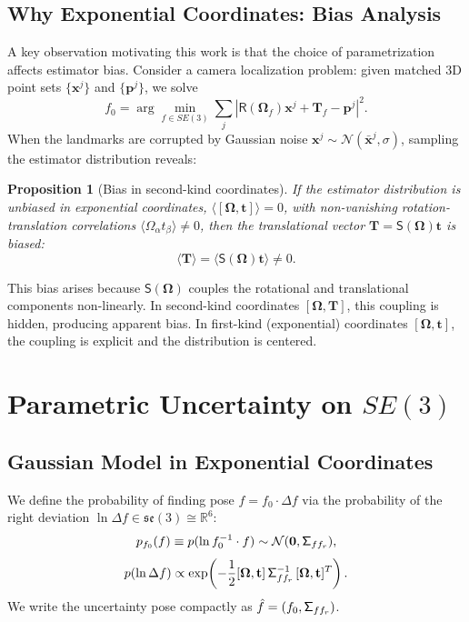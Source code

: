 \documentclass[journal]{IEEEtran}
\newcommand{\real}{\mathbb{R}}
\newcommand{\bfOmega}{\boldsymbol{\Omega}}
\newcommand{\sfSigma}[1]{\mathsf{\Sigma}_\mathnormal{#1}}
\newcommand{\beq}{\begin{equation}}
\newcommand{\eeq}{\end{equation}}
\newtheorem{proposition}{Proposition}
\begin{document}
\subsection{Why Exponential Coordinates: Bias Analysis}
\label{subsec:bias}

A key observation motivating this work is that the choice of 
parametrization affects estimator bias. Consider a camera 
localization problem: given matched 3D point sets 
$\{\mathbf{x}^j\}$ and $\{\mathbf{p}^j\}$, we solve
\beq
    f_0 = \arg\min_{f \in SE(3)} \sum_j 
    |\mathsf{R}(\bfOmega_f)\mathbf{x}^j + \mathbf{T}_f - \mathbf{p}^j|^2.
    \label{eq:localization}
\eeq
When the landmarks are corrupted by Gaussian noise 
$\mathbf{x}^j \sim \mathcal{N}(\bar{\mathbf{x}}^j, \sigma)$, 
sampling the estimator distribution reveals:

\begin{proposition}[Bias in second-kind coordinates]
\label{prop:bias}
If the estimator distribution is unbiased in exponential 
coordinates, $\langle [\bfOmega, \mathbf{t}] \rangle = 0$, 
with non-vanishing rotation-translation correlations 
$\langle \Omega_\alpha t_\beta \rangle \neq 0$, then 
the translational vector $\mathbf{T} = \mathsf{S}(\bfOmega)\mathbf{t}$ 
is biased:
\beq
    \langle \mathbf{T} \rangle = 
    \langle \mathsf{S}(\bfOmega)\mathbf{t} \rangle \neq 0.
    \label{eq:biasmechanism}
\eeq
\end{proposition}

This bias arises because $\mathsf{S}(\bfOmega)$ couples 
the rotational and translational components non-linearly. 
In second-kind coordinates $[\bfOmega, \mathbf{T}]$, 
this coupling is hidden, producing apparent bias. 
In first-kind (exponential) coordinates $[\bfOmega, \mathbf{t}]$, 
the coupling is explicit and the distribution is centered.

\section{Parametric Uncertainty on $SE(3)$}
\label{sec:uncertainty}

\subsection{Gaussian Model in Exponential Coordinates}

We define the probability of finding pose $f = f_0 \cdot \Delta f$ 
via the probability of the right deviation 
$\ln \Delta f \in \mathfrak{se}(3) \cong \real^6$:
\beq
    p_{f_0}(f) \equiv p(\ln f_0^{-1} \cdot f) \sim 
    \mathcal{N}(\mathbf{0}, \sfSigma{ff_r}),
    \label{eq:gaussianSE3}
\eeq
\beq
    p(\ln \Delta f) \propto 
    \exp\!\left(-\frac{1}{2}[\bfOmega, \mathbf{t}]\,
    \sfSigma{ff_r}^{-1}\, [\bfOmega, \mathbf{t}]^T\right).
    \label{eq:gaussexplicit}
\eeq
We write the uncertainty pose compactly as 
$\hat{f} = (f_0, \sfSigma{ff_r})$.
\end{document}
